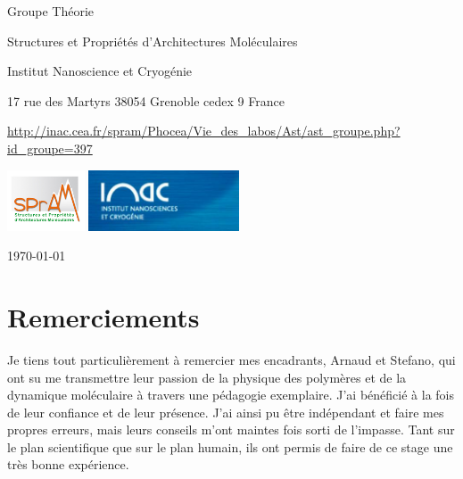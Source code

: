 \documentclass[a4paper,11pt]{article}
\begin{document}
\begin{center}
{%


Groupe Théorie

Structures et Propriétés d'Architectures Moléculaires

Institut Nanoscience et Cryogénie
{\it 

17 rue des Martyrs
38054 Grenoble cedex 9
France}

\url{http://inac.cea.fr/spram/Phocea/Vie_des_labos/Ast/ast_groupe.php?id_groupe=397}
} %

\vspace{1cm}


\includegraphics[height=1.8cm]{spram.jpg} \hspace{0.3cm}
\includegraphics[height=1.8cm]{inac.jpg}

\end{center}

\begin{flushright}
\today
\end{flushright}

\vfill
\hfill 




\setlength{\parindent}{10pt}

\section*{Remerciements}

Je tiens tout particulièrement à remercier mes encadrants, Arnaud et Stefano, qui ont su me transmettre leur passion de la physique des polymères et de la dynamique moléculaire à travers une pédagogie exemplaire. J'ai bénéficié à la fois de leur confiance et de leur présence. J'ai ainsi pu être indépendant et faire mes propres erreurs, mais leurs conseils m'ont maintes fois sorti de l'impasse. Tant sur le plan scientifique que sur le plan humain, ils ont permis de faire de ce stage une très bonne expérience.
\end{document}
